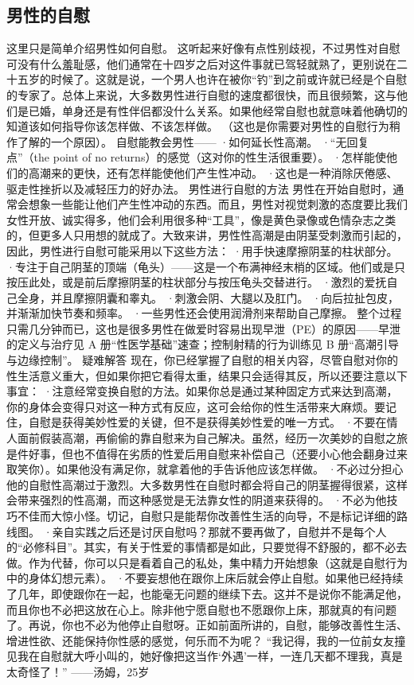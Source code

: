 \documentclass[12pt,UTF8,openany]{ctexbook}
\begin{document}
\subsection*{男性的自慰}
这里只是简单介绍男性如何自慰。
这听起来好像有点性别歧视，不过男性对自慰可没有什么羞耻感，他们通常在十四岁之后对这件事就已驾轻就熟了，更别说在二十五岁的时候了。这就是说，一个男人也许在被你“钓”到之前或许就已经是个自慰的专家了。总体上来说，大多数男性进行自慰的速度都很快，而且很频繁，这与他们是已婚，单身还是有性伴侣都没什么关系。如果他经常自慰也就意味着他确切的知道该如何指导你该怎样做、不该怎样做。
（这也是你需要对男性的自慰行为稍作了解的一个原因）。
自慰能教会男性——
·如何延长性高潮。
·“无回复点”（the point of no returns）的感觉（这对你的性生活很重要）。
·怎样能使他们的高潮来的更快，还有怎样能使他们产生性冲动。
·这也是一种消除厌倦感、驱走性挫折以及减轻压力的好办法。
男性进行自慰的方法
男性在开始自慰时，通常会想象一些能让他们产生性冲动的东西。而且，男性对视觉刺激的态度要比我们女性开放、诚实得多，他们会利用很多种“工具”，像是黄色录像或色情杂志之类的，但更多人只用想的就成了。大致来讲，男性性高潮是由阴茎受刺激而引起的，因此，男性进行自慰可能采用以下这些方法：
·用手快速摩擦阴茎的柱状部分。
·专注于自己阴茎的顶端（龟头）——这是一个布满神经末梢的区域。他们或是只按压此处，或是前后摩擦阴茎的柱状部分与按压龟头交替进行。
·激烈的爱抚自己全身，并且摩擦阴囊和睾丸。
·刺激会阴、大腿以及肛门。
·向后拉扯包皮，并渐渐加快节奏和频率。
·一些男性还会使用润滑剂来帮助自己摩擦。
整个过程只需几分钟而已，这也是很多男性在做爱时容易出现早泄（PE）的原因——早泄的定义与治疗见 A 册“性医学基础”速查；控制射精的行为训练见 B 册“高潮引导与边缘控制”。
疑难解答
现在，你已经掌握了自慰的相关内容，尽管自慰对你的性生活意义重大，但如果你把它看得太重，结果只会适得其反，所以还要注意以下事宜：
·注意经常变换自慰的方法。如果你总是通过某种固定方式来达到高潮，你的身体会变得只对这一种方式有反应，这可会给你的性生活带来大麻烦。要记住，自慰是获得美妙性爱的关键，但不是获得美妙性爱的唯一方式。
·不要在情人面前假装高潮，再偷偷的靠自慰来为自己解决。虽然，经历一次美妙的自慰之旅是件好事，但也不值得在劣质的性爱后用自慰来补偿自己（还要小心他会翻身过来取笑你）。如果他没有满足你，就拿着他的手告诉他应该怎样做。
·不必过分担心他的自慰性高潮过于激烈。大多数男性在自慰时都会将自己的阴茎握得很紧，这样会带来强烈的性高潮，而这种感觉是无法靠女性的阴道来获得的。
·不必为他技巧不佳而大惊小怪。切记，自慰只是能帮你改善性生活的向导，不是标记详细的路线图。
·亲自实践之后还是讨厌自慰吗？那就不要再做了，自慰并不是每个人的“必修科目”。其实，有关于性爱的事情都是如此，只要觉得不舒服的，都不必去做。作为代替，你可以只是看着自己的私处，集中精力开始想象（这就是自慰行为中的身体幻想元素）。
·不要妄想他在跟你上床后就会停止自慰。如果他已经持续了几年，即使跟你在一起，也能毫无问题的继续下去。这并不是说你不能满足他，而且你也不必把这放在心上。除非他宁愿自慰也不愿跟你上床，那就真的有问题了。再说，你也不必为他停止自慰呀。正如前面所讲的，自慰，能够改善性生活、增进性欲、还能保持你性感的感觉，何乐而不为呢？
“我记得，我的一位前女友撞见我在自慰就大呼小叫的，她好像把这当作‘外遇’一样，一连几天都不理我，真是太奇怪了！”
——汤姆，25岁
\end{document}
